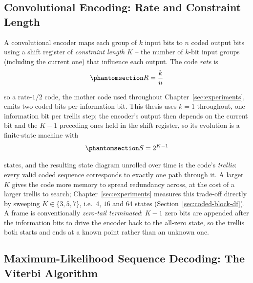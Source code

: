 \subsection{Convolutional Encoding: Rate and Constraint Length}\label{sec:convolutional-encoding-rate-constraint-length}

A convolutional encoder maps each group of $k$ input bits to $n$ coded output bits using a shift register of \emph{constraint length} $K$ -- the number of $k$-bit input groups (including the current one) that influence each output. The code \emph{rate} \cite{ProakisSalehi2008DigitalComm} is
\begin{equation}\protect\phantomsection\label{eq:conv-code-rate}{R = \frac{k}{n}}\end{equation}

so a rate-$1/2$ code, the mother code used throughout Chapter~\ref{sec:experiments}, emits two coded bits per information bit. This thesis uses $k=1$ throughout, one information bit per trellis step; the encoder's output then depends on the current bit and the $K-1$ preceding ones held in the shift register, so its evolution is a finite-state machine with \cite{ProakisSalehi2008DigitalComm}
\begin{equation}\protect\phantomsection\label{eq:conv-trellis-states}{S = 2^{K-1}}\end{equation}

states, and the resulting state diagram unrolled over time is the code's \emph{trellis}: every valid coded sequence corresponds to exactly one path through it. A larger $K$ gives the code more memory to spread redundancy across, at the cost of a larger trellis to search; Chapter~\ref{sec:experiments} measures this trade-off directly by sweeping $K \in \{3, 5, 7\}$, i.e.\ $4$, $16$ and $64$ states (Section~\ref{sec:coded-block-df}). A frame is conventionally \emph{zero-tail terminated}: $K-1$ zero bits are appended after the information bits to drive the encoder back to the all-zero state, so the trellis both starts and ends at a known point rather than an unknown one.

\subsection{Maximum-Likelihood Sequence Decoding: The Viterbi Algorithm}\label{sec:viterbi-ml-decoding}

